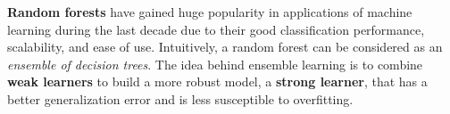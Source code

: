 \documentclass[a4paper,11pt]{article}
\begin{document}


\textbf{Random forests} have gained huge popularity in applications of machine learning during the last decade due to their good classification performance, scalability, and ease of use. Intuitively, a random forest can be considered as an \textit{ensemble of decision trees}. The idea behind ensemble learning is to combine \textbf{weak learners} to build a more robust model, a \textbf{strong learner}, that has a better generalization error and is less susceptible to overfitting. 







\end{document}
